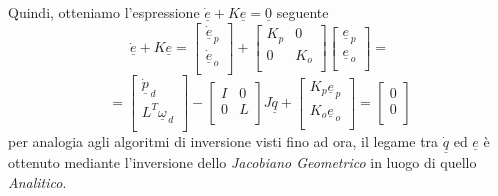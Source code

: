 Quindi, otteniamo l'espressione $\underline{\dot{e}} + K \underline{e} = \underline{0}$ seguente
\begin{equation*}
	\underline{\dot{e}} + K \underline{e} = 
	\begin{bmatrix}
		\underline{\dot{e}}_{\,p} \\
		\underline{\dot{e}}_{\,o} \\
	\end{bmatrix}
	+
	\begin{bmatrix}
		K_p & 0 \\
		0 & K_o \\
	\end{bmatrix}
	\begin{bmatrix}
		\underline{e}_{\,p} \\
		\underline{e}_{\,o} \\
	\end{bmatrix}
	=
\end{equation*}
\begin{equation}
	=
	\begin{bmatrix}
	 	\underline{\dot{p}}_{\,d} \\
		L^T \underline{\omega}_{\,d} \\
	\end{bmatrix}
	-
	\begin{bmatrix}
	 	I & 0 \\
	 	0 & L \\
	\end{bmatrix}
	J
	\underline{\dot{q}}
	+ 
	\begin{bmatrix}
		K_p \underline{e}_{\,p} \\
		K_o \underline{e}_{\,o} \\
	\end{bmatrix}
	= 
	\begin{bmatrix}
		0 \\
		0 \\
	\end{bmatrix}
\end{equation}
per analogia agli algoritmi di inversione visti fino ad ora, il legame tra $\underline{\dot{q}}$ ed $\underline{e}$ è ottenuto mediante l'inversione dello \emph{Jacobiano Geometrico} in luogo di quello \emph{Analitico}.

